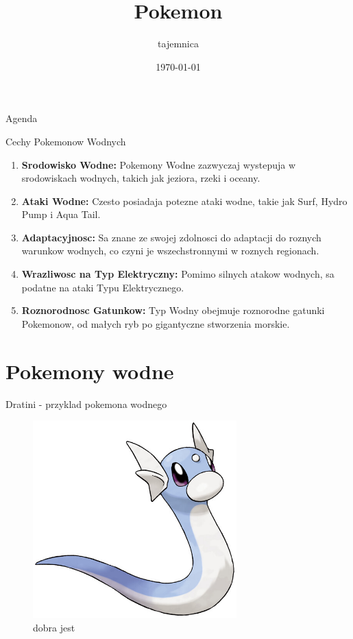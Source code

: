 \documentclass{beamer}
\title{Pokemon}
\author{tajemnica}
\date{\today}
\begin{document}
\begin{frame}
  \titlepage 
\end{frame}

\begin{frame}{Agenda}
  \tableofcontents 
\end{frame}


\begin{frame}{Cechy Pokemonow Wodnych}
  \begin{enumerate}
    \item \textbf{Srodowisko Wodne:} Pokemony Wodne zazwyczaj wystepuja w srodowiskach wodnych, takich jak jeziora, rzeki i oceany.

    \item \textbf{Ataki Wodne:} Czesto posiadaja potezne ataki wodne, takie jak Surf, Hydro Pump i Aqua Tail.

    \item \textbf{Adaptacyjnosc:} Sa znane ze swojej zdolnosci do adaptacji do roznych warunkow wodnych, co czyni je wszechstronnymi w roznych regionach.

    \item \textbf{Wrazliwosc na Typ Elektryczny:} Pomimo silnych atakow wodnych, sa podatne na ataki Typu Elektrycznego.

    \item \textbf{Roznorodnosc Gatunkow:} Typ Wodny obejmuje roznorodne gatunki Pokemonow, od małych ryb po gigantyczne stworzenia morskie.
  \end{enumerate}
\end{frame}


\section{Pokemony wodne}

\begin{frame}{Dratini - przyklad pokemona wodnego}
  \begin{figure}
    \centering
    \includegraphics[width=0.7\textwidth]{dratini.jpg}
    \caption{dobra jest}
    \label{fig:dratini.jpg}
  \end{figure}
\end{frame}
\end{document}

